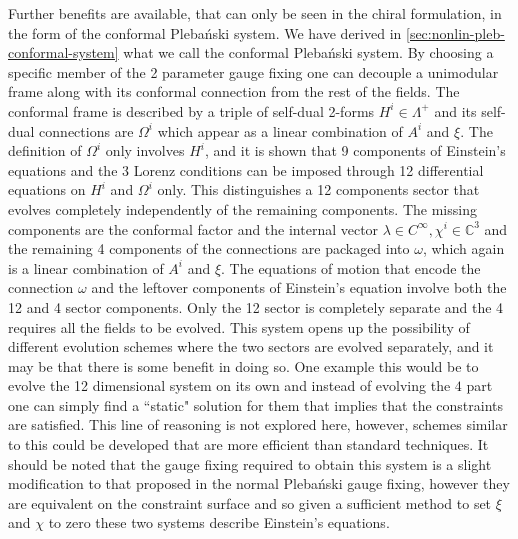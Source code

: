 \documentclass[10pt]{report}
\newcommand{\pleb}[0]{Pleba\'nski}
\theoremstyle{definition}
\newcommand{\C}[0]{\mathbb{C}}
\begin{document}
    Further benefits are available, that can only be seen in the chiral formulation, in the form of the conformal \pleb{} system. We have derived in \cref{sec:nonlin-pleb-conformal-system} what we call the conformal \pleb{} system. By choosing a specific member of the 2 parameter gauge fixing one can decouple a unimodular frame along with its conformal connection from the rest of the fields. The conformal frame is described by a triple of self-dual 2-forms $H^i \in \Lambda^+$ and its self-dual connections are $\Omega^i$ which appear as a linear combination of $A^i$ and $\xi$. The definition of $\Omega^i$ only  involves $H^i$, and it is shown that 9 components of Einstein's equations and the 3 Lorenz conditions can be imposed through 12 differential equations on $H^i$ and $\Omega^i$ only. This distinguishes a 12 components sector that evolves completely independently of the remaining components. The missing components are the conformal factor and the internal vector $\lambda \in C^\infty, \chi^i \in \C^3$ and the remaining 4 components of the connections are packaged into $\omega$, which again is a linear combination of $A^i$ and $\xi$. The equations of motion that encode the connection $\omega$ and the leftover components of Einstein's equation involve both the 12 and 4 sector components. Only the 12 sector is completely separate and the 4 requires all the fields to be evolved. This system opens up the possibility of different evolution schemes where the two sectors are evolved separately, and it may be that there is some benefit in doing so. One example this would be to evolve the 12 dimensional system on its own and instead of evolving the $4$ part one can simply find a ``static" solution for them that implies that the constraints are satisfied. This line of reasoning is not explored here, however, schemes similar to this could be developed that are more efficient than standard techniques. It should be noted that the gauge fixing required to obtain this system is a slight modification to that proposed in the normal \pleb{} gauge fixing, however they are equivalent on the constraint surface and so given a sufficient method to set $\xi$ and $\chi$ to zero these two systems describe Einstein's equations.
\end{document}
